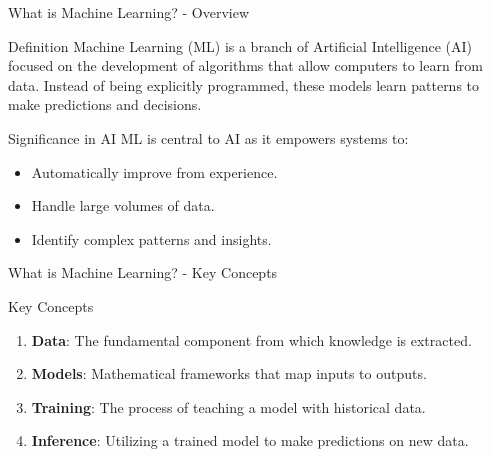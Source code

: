 \documentclass[aspectratio=169]{beamer}
\begin{document}
\begin{frame}[fragile]{What is Machine Learning? - Overview}
    \begin{block}{Definition}
        Machine Learning (ML) is a branch of Artificial Intelligence (AI) focused on the development of algorithms that allow computers to learn from data. Instead of being explicitly programmed, these models learn patterns to make predictions and decisions.
    \end{block}
    
    \begin{block}{Significance in AI}
        ML is central to AI as it empowers systems to:
        \begin{itemize}
            \item Automatically improve from experience.
            \item Handle large volumes of data.
            \item Identify complex patterns and insights.
        \end{itemize}
    \end{block}
\end{frame}

\begin{frame}[fragile]{What is Machine Learning? - Key Concepts}
    \begin{block}{Key Concepts}
        \begin{enumerate}
            \item \textbf{Data}: The fundamental component from which knowledge is extracted.
            \item \textbf{Models}: Mathematical frameworks that map inputs to outputs.
            \item \textbf{Training}: The process of teaching a model with historical data.
            \item \textbf{Inference}: Utilizing a trained model to make predictions on new data.
        \end{enumerate}
    \end{block}
\end{frame}
\end{document}
